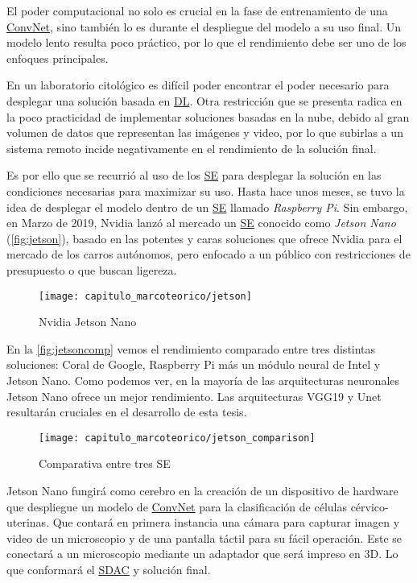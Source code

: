 El poder computacional no solo es crucial en la fase de entrenamiento de una
\hyperlink{abbr}{ConvNet}, sino también lo es durante el despliegue del modelo a
su uso final. Un modelo lento resulta poco práctico, por lo que el rendimiento
debe ser uno de los enfoques principales.

En un laboratorio citológico es difícil poder encontrar el poder necesario para
desplegar una solución basada en \hyperlink{abbr}{DL}. Otra restricción que se presenta radica en
la poco practicidad de implementar soluciones basadas en la nube, debido al gran
volumen de datos que representan las imágenes y video, por lo que subirlas a un
sistema remoto incide negativamente en el rendimiento de la solución final. 

Es por ello que se recurrió al uso de los \hyperlink{abbr}{SE} para desplegar la
solución en las condiciones necesarias para maximizar su uso. Hasta hace unos
meses, se tuvo la idea de desplegar el modelo dentro de un \hyperlink{abbr}{SE}
llamado \emph{Raspberry Pi}. Sin embargo, en Marzo de 2019, Nvidia lanzó al
mercado un \hyperlink{abbr}{SE} conocido como \emph{Jetson Nano} (\autoref{fig:jetson}), basado en
las potentes y caras soluciones que ofrece Nvidia para el mercado de los carros
autónomos, pero enfocado a un público con restricciones de presupuesto o que
buscan ligereza.

\begin{figure}[H]
    \centering
    \texttt{[image: capitulo\_marcoteorico/jetson]}
    \caption{Nvidia Jetson Nano}\label{fig:jetson}
\end{figure}

En la \autoref{fig:jetsoncomp} vemos el rendimiento comparado entre tres
distintas soluciones: Coral de Google, Raspberry Pi más un módulo neural de
Intel y Jetson Nano. Como podemos ver, en la mayoría de las arquitecturas
neuronales Jetson Nano ofrece un mejor rendimiento. Las arquitecturas VGG19 y
Unet resultarán cruciales en el desarrollo de esta tesis. 

\begin{figure}[H]
    \centering
    \texttt{[image: capitulo\_marcoteorico/jetson\_comparison]}
    \caption{Comparativa entre tres SE}\label{fig:jetsoncomp}
\end{figure}

Jetson Nano fungirá como cerebro en la creación de un dispositivo de hardware
que despliegue un modelo de \hyperlink{abbr}{ConvNet} para la clasificación de células
cérvico-uterinas. Que contará en primera instancia una cámara para capturar
imagen y video de un microscopio y de una pantalla táctil para su fácil
operación. Este se conectará a un microscopio mediante un adaptador que será
impreso en 3D. Lo que conformará el \hyperlink{abbr}{SDAC} y solución final.

